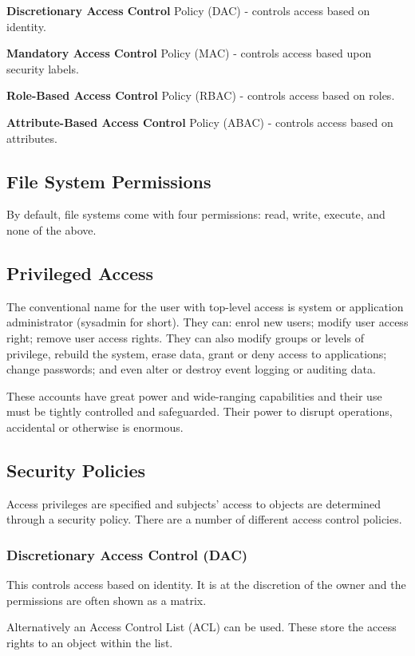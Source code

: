 \textbf{Discretionary Access Control} Policy (DAC) - controls access based on identity.

\textbf{Mandatory Access Control} Policy (MAC) - controls access based upon security labels.

\textbf{Role-Based Access Control} Policy (RBAC) - controls access based on roles.

\textbf{Attribute-Based Access Control} Policy (ABAC) - controls access based on attributes.

\subsection*{File System Permissions}
By default, file systems come with four permissions: read, write, execute, and none of the above.

\subsection*{Privileged Access}
The conventional name for the user with top-level access is system or application administrator (sysadmin for short). They can: enrol new users; modify user access right; remove user access rights. They can also modify groups or levels of privilege, rebuild the system, erase data, grant or deny access to applications; change passwords; and even alter or destroy event logging or auditing data.

These accounts have great power and wide-ranging capabilities and their use must be tightly controlled and safeguarded. Their power to disrupt operations, accidental or otherwise is enormous. 

\subsection*{Security Policies}
Access privileges are specified and subjects' access to objects are determined through a security policy. There are a number of different access control policies.
\subsubsection*{Discretionary Access Control (DAC)}
This controls access based on identity. It is at the discretion of the owner and the permissions are often shown as a matrix.

Alternatively an Access Control List (ACL) can be used. These store the access rights to an object within the list.

